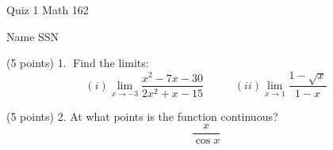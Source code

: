 \documentclass{article}
\begin{document}
\begin{large}
\begin{bf}
\hspace{1.5in}
\parbox{1in}{Quiz 1 \newline Math 162}
\hspace{1in}
\parbox{1in}{ Name \newline SSN}
\end{bf}
\end{large}

 

\vspace{0.3in}
   
(5 points) 1.$\;$ Find the limits: 
$$(i) \lim_{x\rightarrow -3} \frac{x^2-7x-30}{2x^2+x-15}\;\;\;\;\;\;\;\;\;\; 
  (ii)\lim_{x\rightarrow 1} \frac{1-\sqrt{x}}{1-x}
$$   
 
  

\vspace{4.in}

(5 points) 2. At what points is the function continuous?
$$ \frac{x}{\cos x}$$



  
\end{document}
